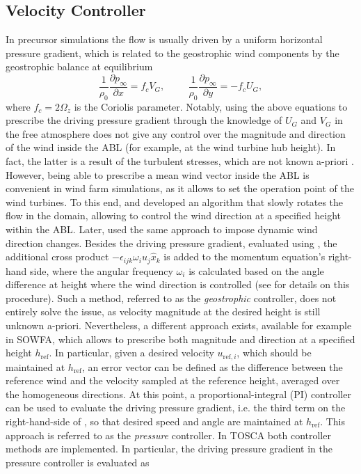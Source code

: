 \subsection{Velocity Controller}
\label{subsec:velocityController}
In precursor simulations the flow is usually driven by a uniform horizontal pressure gradient, which is related to the geostrophic wind components by the geostrophic balance at equilibrium
\begin{equation}
	\frac{1}{\rho_0}\frac{\partial p_\infty}{\partial x} = f_cV_G, \hspace{1cm}
	\frac{1}{\rho_0}\frac{\partial p_\infty}{\partial y} = -f_cU_G, \label{eq:geoBalance}
\end{equation}
where $f_c = 2\Omega_z$ is the Coriolis parameter. Notably, using the above equations to prescribe the driving pressure gradient through the knowledge of $U_G$ and $V_G$ in the free atmosphere does not give any control over the magnitude and direction of the wind inside the ABL (for example, at the wind turbine hub height). In fact, the latter is a result of the turbulent stresses, which are not known a-priori \citep{Nieuwstadt1983}. However, being able to prescribe a mean wind vector inside the ABL is convenient in wind farm simulations, as it allows to set the operation point of the wind turbines. To this end, \cite{SescuMeneveau2014} and \cite{AllaertsMeyers2015} developed an algorithm that slowly rotates the flow in the domain, allowing to control the wind direction at a specified height within the ABL. Later, \cite{StierenEtAl2021} used the same approach to impose dynamic wind direction changes. Besides the driving pressure gradient, evaluated using , the additional cross product $-\epsilon_{ijk}\omega_iu_j\widehat{x}_k$ is added to the momentum equation's right-hand side, where the angular frequency $\omega_i$ is calculated based on the angle difference at height where the wind direction is controlled (see \citealp{AllaertsMeyers2015} for details on this procedure). Such a method, referred to as the \textit{geostrophic} controller, does not entirely solve the issue, as velocity magnitude at the desired height is still unknown a-priori. Nevertheless, a different approach exists, available for example in SOWFA, which allows to prescribe both magnitude and direction at a specified height $h_\text{ref}$. In particular, given a desired velocity $u_{\text{ref},i}$, which should be maintained at $h_\text{ref}$, an error vector can be defined as the difference between the reference wind and the velocity sampled at the reference height, averaged over the homogeneous directions. At this point, a proportional-integral (\acrshort{PI}) controller can be used to evaluate the driving pressure gradient, i.e. the third term on the right-hand-side of , so that desired speed and angle are maintained at $h_\text{ref}$. This approach is referred to as the \textit{pressure} controller. In TOSCA both controller methods are implemented. In particular, the driving pressure gradient in the pressure controller is evaluated as
